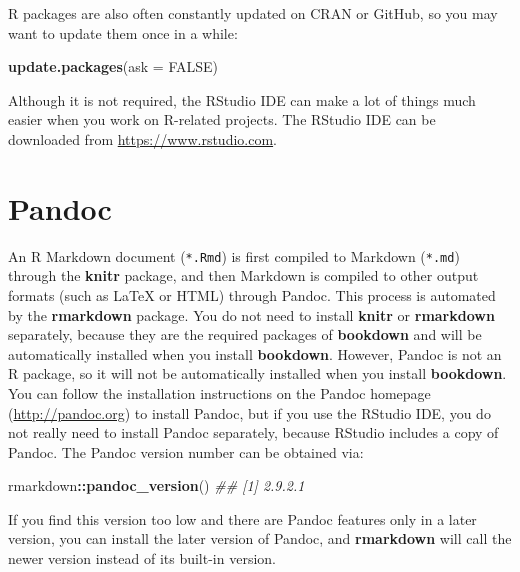 \documentclass[
  12pt,
]{book}
\newenvironment{Shaded}{\begin{snugshade}}{\end{snugshade}}
\newcommand{\CommentTok}[1]{\textcolor[rgb]{0.56,0.35,0.01}{\textit{#1}}}
\newcommand{\DataTypeTok}[1]{\textcolor[rgb]{0.13,0.29,0.53}{#1}}
\newcommand{\KeywordTok}[1]{\textcolor[rgb]{0.13,0.29,0.53}{\textbf{#1}}}
\newcommand{\NormalTok}[1]{#1}
\newcommand{\OperatorTok}[1]{\textcolor[rgb]{0.81,0.36,0.00}{\textbf{#1}}}
\newcommand{\OtherTok}[1]{\textcolor[rgb]{0.56,0.35,0.01}{#1}}
\begin{document}
R packages are also often constantly updated on CRAN or GitHub, so you may want to update them once in a while:

\begin{Shaded}
\begin{Highlighting}[]
\KeywordTok{update.packages}\NormalTok{(}\DataTypeTok{ask =} \OtherTok{FALSE}\NormalTok{)}
\end{Highlighting}
\end{Shaded}

Although it is not required, the RStudio IDE can make a lot of things much easier when you work on R-related projects. The RStudio IDE can be downloaded from \url{https://www.rstudio.com}.

\hypertarget{pandoc}{%
\section{Pandoc}\label{pandoc}}

An R Markdown document (\texttt{*.Rmd}) is first compiled to Markdown (\texttt{*.md}) through the \textbf{knitr} package, and then Markdown is compiled to other output formats (such as LaTeX or HTML) through Pandoc. This process is automated by the \textbf{rmarkdown} package. You do not need to install \textbf{knitr} or \textbf{rmarkdown} separately, because they are the required packages of \textbf{bookdown} and will be automatically installed when you install \textbf{bookdown}. However, Pandoc is not an R package, so it will not be automatically installed when you install \textbf{bookdown}. You can follow the installation instructions on the Pandoc homepage (\url{http://pandoc.org}) to install Pandoc, but if you use the RStudio IDE, you do not really need to install Pandoc separately, because RStudio includes a copy of Pandoc. The Pandoc version number can be obtained via:

\begin{Shaded}
\begin{Highlighting}[]
\NormalTok{rmarkdown}\OperatorTok{::}\KeywordTok{pandoc\_version}\NormalTok{()}
\CommentTok{\#\# [1] \textquotesingle{}2.9.2.1\textquotesingle{}}
\end{Highlighting}
\end{Shaded}

If you find this version too low and there are Pandoc features only in a later version, you can install the later version of Pandoc, and \textbf{rmarkdown} will call the newer version instead of its built-in version.
\end{document}
